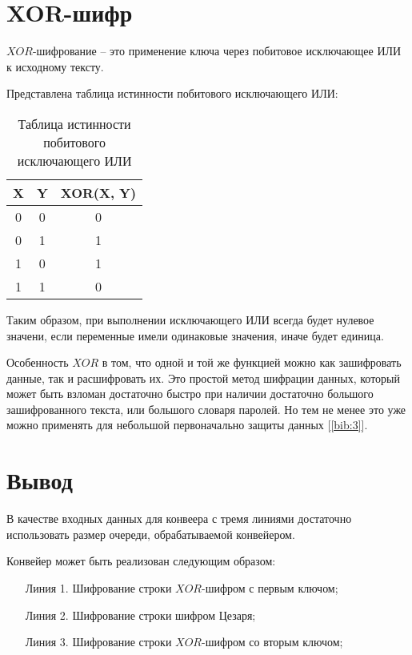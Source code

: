 \section{XOR-шифр}
	\par $XOR$-шифрование -- это применение ключа через побитовое исключающее ИЛИ к исходному тексту.
	\par Представлена таблица истинности побитового исключающего ИЛИ:
	\begin{table}[h]
	\begin{center}
		\caption{\label{table:xor} Таблица истинности побитового исключающего ИЛИ}
		\begin{tabular}{|c| c| c|} 
			\hline
			X & Y & XOR(X, Y) \\
			\hline\hline
			0 & 0 & 0\\
			\hline
			0 & 1 & 1\\
			\hline
			1 & 0 & 1\\
			\hline
			1 & 1 & 0\\
			\hline
		\end{tabular}
	\end{center}
	\end{table}
	\par Таким образом, при выполнении исключающего ИЛИ всегда будет нулевое значени, если переменные имели одинаковые значения, иначе будет единица.
	\par Особенность $XOR$ в том, что одной и той же функцией можно как зашифровать данные, так и расшифровать их. Это простой метод шифрации данных, который может быть взломан достаточно быстро при наличии достаточно большого зашифрованного текста, или большого словаря паролей. Но тем не менее это уже можно применять для небольшой первоначально защиты данных [\ref{bib:3}].

	\section*{Вывод}
\par В качестве входных данных для конвеера с тремя линиями достаточно использовать размер очереди, обрабатываемой конвейером.

Конвейер может быть реализован следующим образом:
\begin{enumerate}
	\item [Линия 1.] Шифрование строки $XOR$-шифром с первым ключом;

	\item [Линия 2.] Шифрование строки шифром Цезаря;

	\item [Линия 3.] Шифрование строки $XOR$-шифром со вторым ключом;
\end{enumerate}

\newpage